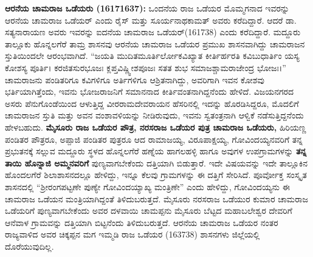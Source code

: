\textbf{ ಆರನೆಯ ಚಾಮರಾಜ ಒಡೆಯರು (16171637): } ಒಂದನೆಯ ರಾಜ ಒಡೆಯರ ಮೊಮ್ಮಗನಾದ ಇವರನ್ನು ಆರನೆಯ ಚಾಮರಾಜ ಒಡೆಯರ್​ ಎಂದು ರೈಸ್​ ಮತ್ತು ಸೂರ್ಯನಾಥಕಾಮತ್​ ಅವರು ಕರೆದಿದ್ದಾರೆ. ಆದರೆ ಡಾ. ಸತ್ಯನಾರಾಯಣ ಅವರು ಇವರನ್ನು ಐದನೆಯ ಚಾಮರಾಜ ಒಡೆಯರ್​(161738) ಎಂದು ಕರೆದಿದ್ದಾರೆ. ಮದ್ದೂರು ತಾಲ್ಲೂಕು ಹೊನ್ನಲಗೆರೆ ತಾಮ್ರ ಶಾಸನವು ಆರನೆಯ ಚಾಮರಾಜ ಒಡೆಯರ ಪ್ರಮುಖ ಶಾಸನವಾಗಿದ್ದು ಚಾಮರಾಜನ ಸ್ತುತಿಯಿಂದಲೇ ಆರಂಭವಾಗಿದೆ. “ಜಯತಿ ಮುದಿತಮೂರ್ತಿರ್ಲೋಕವಿಖ್ಯಾತ ಕೀರ್ತಿರ್ಹರತಿ ಕವಿಬುಧಾರ್ತಿಂ ಯಸ್ಯ ಕೋಶಸ್ಯ ಪೂರ್ತಿ। ಕರಜಿತಸುರಭೂಜಃ ಕ್ಲಪ್ತವಿಷ್ಣ್ವೀಶಪೂಜಃ ಸತತ ಶುಭ ಸಮಾಜಶ್ಚಾಮರಾಜೇಂದ್ರ ಭೋಜಃ।” ಚಾಮರಾಜನು ಪಂಡಿತರಿಗೂ ಕವಿಗಳಿಗೂ ಅರ್ತಿಗಳಿಗೂ ಆಶ್ರಿತನಾಗಿದ್ದು, ಅವರಿಗಾಗಿ ಇವನ ಕೋಶವು ಭರ್ತಿಯಾಗಿತ್ತೆಂದು, ಇವನು ಭೋಜರಾಜನಿಗೆ ಸಮಾನನಾದ ಕೀರ್ತಿವಂತನಾಗಿದ್ದನೆಂದು ಹೇಳಿದೆ. ವಿಜಯನಗರದ ಅಸರು ಪೆನುಗೊಂಡೆಯಿಂದ ಆಳುತ್ತಿದ್ದ ವೀರರಾಮದೇವರಾಯನ ಹೆಸರಿನಲ್ಲಿ ಇದನ್ನು ಹೊರಡಿಸಿದ್ದರೂ, ಮೊದಲಿಗೆ ಚಾಮರಾಜನ ಸ್ತುತಿ ಮತ್ತು ಅವನ ವಂಶಾವಳಿಯನ್ನು ನೀಡಿರುವುದು, ಇವನು ಸ್ವತಂತ್ರನಾಗಿ ಆಳ್ವಿಕೆ ನಡೆಸುತ್ತಿದ್ದನೆಂದು ಹೇಳಬಹುದು. \textbf{ಮೈಸೂರು ರಾಜ ಒಡೆಯರ ಪೌತ್ರ, ನರಸರಾಜ ಒಡೆಯರ ಪುತ್ರ ಚಾಮರಾಜ ಒಡೆಯರು,} ಹಿರಿಯಣ್ಣ ಪಂಡಿತರ ಪೌತ್ರರೂ, ಅಪ್ಪಾಜಿ ಪಂಡಿತರ ಪುತ್ರರೂ ಆದ ರಾಮಾಜಯ್ಯ, ವಿರೂಪಾಕ್ಷಯ್ಯ, ಗೋವಿಂದಯ್ಯನವರಿಗೆ ತನ್ನ ಪ್ರಭುತನಕ್ಕೆ ಸಲ್ಲುವ ಮದ್ದೂರು ಸ್ಥಳದ ಹೊನ್ನಲಗೆರೆ ಹಣ್ನೆಯ ಹಾಗಲಹಳ್ಳಿ ಹಾಗೂ ಅವುಗಳ ಉಪಗ್ರಾಮಗಳನ್ನು \textbf{ತನ್ನ ತಾಯಿ ಹೊನ್ನಾಜಿ ಅಮ್ಮನವರಿಗೆ} ಪುಣ್ಯವಾಗಬೇಕೆಂದು ದತ್ತಿಯಾಗಿ ಬಿಡುತ್ತಾರೆ. ಇದೇ ವಿಷಯವನ್ನು ಇದೇ ತಾಲ್ಲೂಕಿನ ಹೊಂದಲಗೆರೆ ಶಿಲಾಶಾಸನದಲ್ಲೂ ಹೇಳಿದ್ದು, ಇನ್ನೂ ಕೆಲವು ಗ್ರಾಮಗಳನ್ನು ಈ ದತ್ತಿಗೆ ಸೇರಿಸಿದೆ. ಪೂರ್ವೋಕ್ತ ಸಂಸ್ಕೃತ ಶಾಸನದಲ್ಲಿ “ಶ‍್ರೀರಂಗಪಟ್ಟಣೇ ಪುಣ್ಯೇ ಗೋವಿಂದಯ್ಯಾಖ್ಯ ಮಂತ್ರಿಣೇ” ಎಂದು ಹೇಳಿದ್ದು, ಗೋವಿಂದಯ್ಯನು ಈ ಚಾಮರಾಜ ಒಡೆಯನ ಮಂತ್ರಿಯಾಗಿದ್ದಂತೆ ತಿಳಿದುಬರುತ್ತದೆ. ಮೈಸೂರು ನರಸರಾಜ ಒಡೆಯುರ ಕುಮಾರ ಚಾಮರಾಜ ಒಡೆಯರಿಗೆ ಪುಣ್ಯವಾಗಬೇಕೆಂದು ಅವರ ದಳವಾಯಿ ಚಾಮಪ್ಪನು ಮೈಸೂರು ಬೆಟ್ಟದ ಮಹಾಬಲೇಶ್ವರ ದೇವರಿಗೆ ಆನೆವಾಳ ಗ್ರಾಮವನ್ನು ದತ್ತಿಯಾಗಿ ಬಿಟ್ಟನೆಂದು ತಿಳಿದುಬರುತ್ತದೆ. ಆರನೆಯ ಚಾಮರಾಜ ಒಡೆಯರ ನಂತರ ರಾಜ್ಯವಾಳಿದ ಅವರ ಚಿಕ್ಕಪ್ಪನ ಮಗ ಇಮ್ಮಡಿ ರಾಜ ಒಡೆಯರ (163738) ಶಾಸನಗಳು ಜಿಲ್ಲೆಯಲ್ಲಿ ದೊರೆಯುವುದಿಲ್ಲ.

